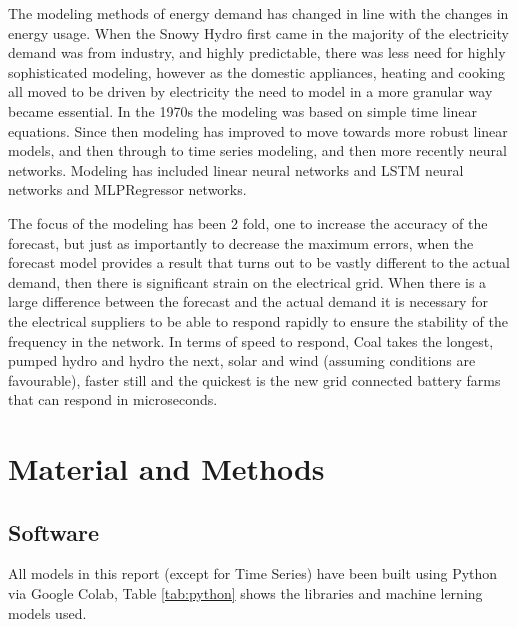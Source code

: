 \documentclass[mstat,12pt]{unswthesis}
\begin{document}
The modeling methods of energy demand has changed in line with the
changes in energy usage. When the Snowy Hydro first came in the majority
of the electricity demand was from industry, and highly predictable,
there was less need for highly sophisticated modeling, however as the
domestic appliances, heating and cooking all moved to be driven by
electricity the need to model in a more granular way became essential.
In the 1970s the modeling was based on simple time linear
equations\cite{pawar_2020_predicting}\cite{griffin_1993_methodological}.
Since then modeling has improved to move towards more robust linear
models, and then through to time series modeling, and then more recently
neural networks\cite{marcjasz_2008_neural}. Modeling has included linear
neural networks and LSTM neural networks and MLPRegressor networks.

The focus of the modeling has been 2 fold, one to increase the accuracy
of the forecast, but just as importantly to decrease the maximum errors,
when the forecast model provides a result that turns out to be vastly
different to the actual demand, then there is significant strain on the
electrical grid. When there is a large difference between the forecast
and the actual demand it is necessary for the electrical suppliers to be
able to respond rapidly to ensure the stability of the frequency in the
network. In terms of speed to respond, Coal takes the longest, pumped
hydro and hydro the next, solar and wind (assuming conditions are
favourable), faster still and the quickest is the new grid connected
battery farms that can respond in microseconds.

\hypertarget{material-and-methods}{%
\chapter{Material and Methods}\label{material-and-methods}}

\hypertarget{software}{%
\section{Software}\label{software}}

All models in this report (except for Time Series) have been built using
Python via Google Colab, Table \ref{tab:python} shows the libraries and
machine lerning models used.
\end{document}
